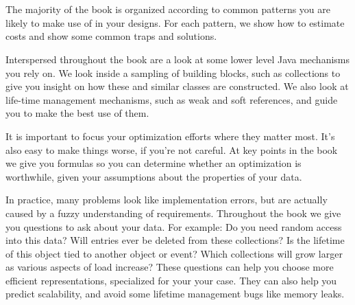 \section{\thetitle}

The majority of the book is organized according to common patterns you are
likely to make use of in your designs. For each pattern, we show how to estimate
costs and show some common traps and solutions.

Interspersed throughout the book are a look at some lower level Java mechanisms
you rely on. We look inside a sampling of building blocks, such as collections
to give you insight on how these and similar classes are constructed.  We also
look at life-time management mechanisms, such as weak and soft references, and
guide you to make the best use of them.

It is important to focus your optimization efforts where they matter most. It's also 
easy to make things worse, if you're not careful.
At key points in the book we give you formulas so you can determine whether an optimization is worthwhile,
given your assumptions about the properties of your data.

In practice, many problems look like implementation errors, but are actually caused by a
fuzzy understanding of requirements. Throughout the book we give you questions to
ask about your data. For example: Do you need random access into this data? Will entries ever be
deleted from these collections? Is the lifetime of this object tied to another object or event? Which
collections will grow larger as various aspects of load increase?  These questions can help you
choose more efficient representations, specialized for your your case.  They can also help you predict
scalability, and avoid some lifetime management bugs like memory leaks.






